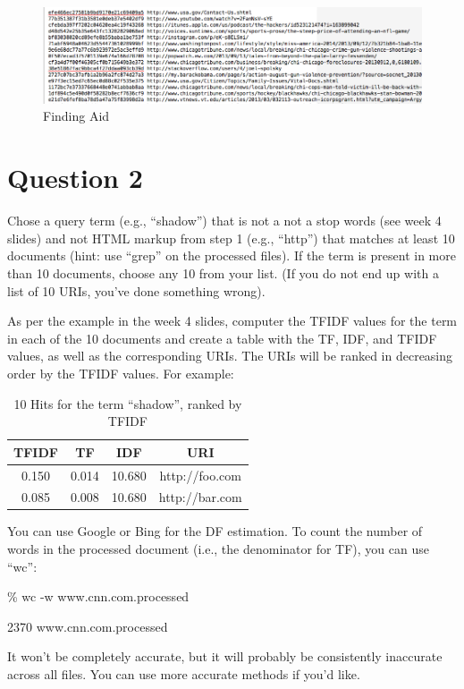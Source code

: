 \documentclass{article}
\begin{document}
\begin{figure}[H]
\centering
\includegraphics[scale=0.50]{q1/findingaid}
\caption{Finding Aid}
\label{findingaid}
\end{figure}

\newpage

\section*{Question 2}

Chose a query term (e.g., ``shadow'') that is not a not a stop words (see week 4 slides) and not HTML markup from step 1 (e.g., ``http'') that matches at least 10 documents (hint: use ``grep'' on the processed files). If the term is present in more than 10 documents, choose any 10 from your list. (If you do not end up with a list of 10 URIs, you've done something wrong).

As per the example in the week 4 slides, computer the TFIDF values for the term in each of the 10 documents and create a table with the TF, IDF, and TFIDF values, as well as the corresponding URIs. The URIs will be ranked in decreasing order by the TFIDF values. For example:

\begin{table}[!h]
\centering
\caption{10 Hits for the term ``shadow'', ranked by TFIDF}
\begin{tabular}{c c c c}
\hline
TFIDF & TF & IDF & URI \\
\hline
\hline
0.150 & 0.014 & 10.680 & http://foo.com \\
0.085 & 0.008 & 10.680 & http://bar.com \\
\hline
\end{tabular}
\end{table}

You can use Google or Bing for the DF estimation. To count the number of words in the processed document (i.e., the denominator for TF),  you can use ``wc'':

\% wc -w www.cnn.com.processed

2370 www.cnn.com.processed

It won't be completely accurate, but it will probably be consistently inaccurate across all files. You can use more accurate methods if you'd like.
\end{document}
